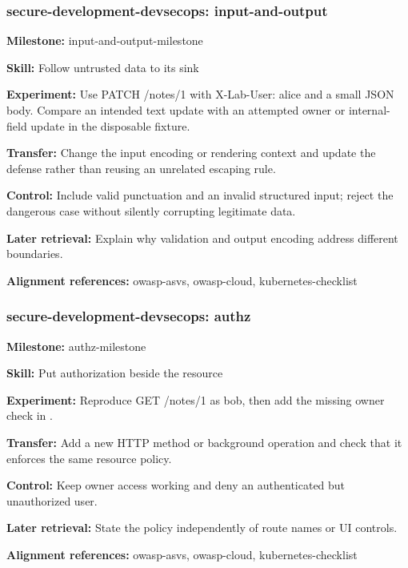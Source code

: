 \subsubsection{secure-development-devsecops: input-and-output}
\noindent\textbf{Milestone:} input-and-output-milestone\par
\noindent\textbf{Skill:} Follow untrusted data to its sink\par
\noindent\textbf{Experiment:} Use PATCH /notes/1 with X-Lab-User: alice and a small JSON body. Compare an intended text update with an attempted owner or internal-field update in the disposable fixture.\par
\noindent\textbf{Transfer:} Change the input encoding or rendering context and update the defense rather than reusing an unrelated escaping rule.\par
\noindent\textbf{Control:} Include valid punctuation and an invalid structured input; reject the dangerous case without silently corrupting legitimate data.\par
\noindent\textbf{Later retrieval:} Explain why validation and output encoding address different boundaries.\par
\noindent\textbf{Alignment references:} owasp-asvs, owasp-cloud, kubernetes-checklist\par
\subsubsection{secure-development-devsecops: authz}
\noindent\textbf{Milestone:} authz-milestone\par
\noindent\textbf{Skill:} Put authorization beside the resource\par
\noindent\textbf{Experiment:} Reproduce GET /notes/1 as bob, then add the missing owner check in .\par
\noindent\textbf{Transfer:} Add a new HTTP method or background operation and check that it enforces the same resource policy.\par
\noindent\textbf{Control:} Keep owner access working and deny an authenticated but unauthorized user.\par
\noindent\textbf{Later retrieval:} State the policy independently of route names or UI controls.\par
\noindent\textbf{Alignment references:} owasp-asvs, owasp-cloud, kubernetes-checklist\par
